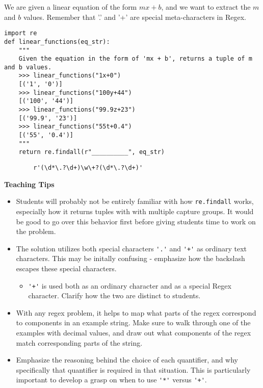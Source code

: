 \begin{blocksection}
\question We are given a linear equation of the form $mx+b$, and we want to extract the $m$ and $b$ values. Remember that '.' and '+' are special meta-characters in Regex.

\begin{lstlisting}
import re
def linear_functions(eq_str):
    """
    Given the equation in the form of 'mx + b', returns a tuple of m and b values.
    >>> linear_functions("1x+0")
    [('1', '0')]
    >>> linear_functions("100y+44")
    [('100', '44')]
    >>> linear_functions("99.9z+23")
    [('99.9', '23')]
    >>> linear_functions("55t+0.4")
    [('55', '0.4')]
    """
    return re.findall(r"__________", eq_str)
\end{lstlisting}

\begin{solution}[2in]
    \begin{lstlisting}
        r'(\d*\.?\d+)\w\+?(\d*\.?\d+)'
    \end{lstlisting}
\end{solution}
\end{blocksection}

\begin{guide}
\begin{blocksection}
\textbf{Teaching Tips}
    \begin{itemize}
        \item Students will probably not be entirely familiar with how \lstinline{re.findall} works, especially how it returns tuples with with multiple capture groups. It would be good to go over this behavior first before giving students time to work on the problem.
        \item The solution utilizes both special characters \lstinline$'.'$ and \lstinline$'+'$ as ordinary text characters. This may be initally confusing - emphasize how the backslash escapes these special characters.
        \begin{itemize}
            \item \lstinline$'+'$ is used both as an ordinary character and as a special Regex character. Clarify how the two are distinct to students.
        \end{itemize}
        \item With any regex problem, it helps to map what parts of the regex correspond to components in an example string. Make sure to walk through one of the examples with decimal values, and draw out what components of the regex match corresponding parts of the string.
        \item Emphasize the reasoning behind the choice of each quantifier, and why specifically that quantifier is required in that situation. This is particularly important to develop a grasp on when to use \lstinline$'*'$ versus \lstinline$'+'$.
    \end{itemize}
\end{blocksection}
\end{guide}
    